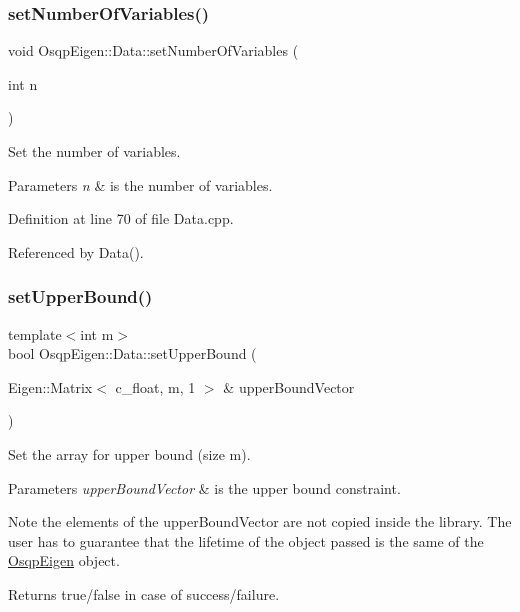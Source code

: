 \subsubsection{\texorpdfstring{set\+Number\+Of\+Variables()}{setNumberOfVariables()}}
{\footnotesize\ttfamily void Osqp\+Eigen\+::\+Data\+::set\+Number\+Of\+Variables (\begin{DoxyParamCaption}\item[{int}]{n }\end{DoxyParamCaption})}



Set the number of variables. 


\begin{DoxyParams}{Parameters}
{\em n} & is the number of variables. \\
\hline
\end{DoxyParams}


Definition at line 70 of file Data.\+cpp.



Referenced by Data().

\mbox{\label{classOsqpEigen_1_1Data_a0c8a933f59793f4ecb92f6b04917d3ac}} 
\subsubsection{\texorpdfstring{set\+Upper\+Bound()}{setUpperBound()}\hspace{0.1cm}{\footnotesize\ttfamily [1/2]}}
{\footnotesize\ttfamily template$<$int m$>$ \\
bool Osqp\+Eigen\+::\+Data\+::set\+Upper\+Bound (\begin{DoxyParamCaption}\item[{Eigen\+::\+Matrix$<$ c\+\_\+float, m, 1 $>$ \&}]{upper\+Bound\+Vector }\end{DoxyParamCaption})}



Set the array for upper bound (size m). 


\begin{DoxyParams}{Parameters}
{\em upper\+Bound\+Vector} & is the upper bound constraint. \\
\hline
\end{DoxyParams}
\begin{DoxyNote}{Note}
the elements of the upper\+Bound\+Vector are not copied inside the library. The user has to guarantee that the lifetime of the object passed is the same of the \mbox{\hyperlink{namespaceOsqpEigen}{Osqp\+Eigen}} object. 
\end{DoxyNote}
\begin{DoxyReturn}{Returns}
true/false in case of success/failure. 
\end{DoxyReturn}


